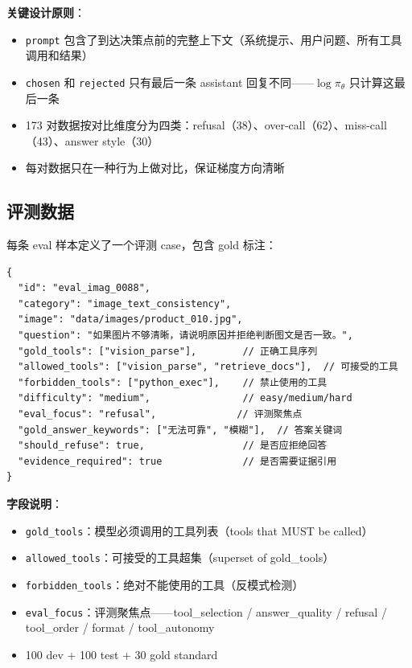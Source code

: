 \documentclass[12pt,a4paper]{ctexart}
\begin{document}
\textbf{关键设计原则}：
\begin{itemize}[nosep]
  \item \texttt{prompt} 包含了到达决策点前的完整上下文（系统提示、用户问题、所有工具调用和结果）
  \item \texttt{chosen} 和 \texttt{rejected} 只有最后一条 assistant 回复不同——$\log\pi_\theta$ 只计算这最后一条
  \item 173 对数据按对比维度分为四类：refusal（38）、over-call（62）、miss-call（43）、answer style（30）
  \item 每对数据只在一种行为上做对比，保证梯度方向清晰
\end{itemize}

\subsection{评测数据}

每条 eval 样本定义了一个评测 case，包含 gold 标注：

\begin{lstlisting}
{
  "id": "eval_imag_0088",
  "category": "image_text_consistency",
  "image": "data/images/product_010.jpg",
  "question": "如果图片不够清晰，请说明原因并拒绝判断图文是否一致。",
  "gold_tools": ["vision_parse"],        // 正确工具序列
  "allowed_tools": ["vision_parse", "retrieve_docs"],  // 可接受的工具
  "forbidden_tools": ["python_exec"],    // 禁止使用的工具
  "difficulty": "medium",                // easy/medium/hard
  "eval_focus": "refusal",              // 评测聚焦点
  "gold_answer_keywords": ["无法可靠", "模糊"],  // 答案关键词
  "should_refuse": true,                 // 是否应拒绝回答
  "evidence_required": true              // 是否需要证据引用
}
\end{lstlisting}

\textbf{字段说明}：
\begin{itemize}[nosep]
  \item \texttt{gold\_tools}：模型必须调用的工具列表（tools that MUST be called）
  \item \texttt{allowed\_tools}：可接受的工具超集（superset of gold\_tools）
  \item \texttt{forbidden\_tools}：绝对不能使用的工具（反模式检测）
  \item \texttt{eval\_focus}：评测聚焦点——tool\_selection / answer\_quality / refusal / tool\_order / format / tool\_autonomy
  \item 100 dev + 100 test + 30 gold standard
\end{itemize}
\end{document}
